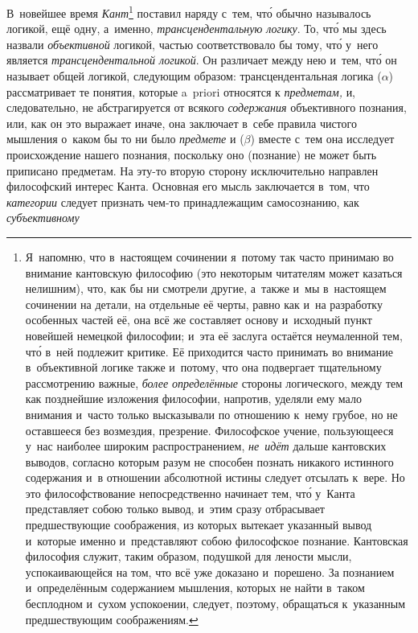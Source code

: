 В~новейшее время {\em Кант}\footnote{
Я~напомню, что в~настоящем сочинении я~потому так часто принимаю во
внимание кантовскую философию (это некоторым читателям может казаться
нелишним), что, как бы ни смотрели другие, а~также и~мы в~настоящем
сочинении на детали, на отдельные её черты, равно как и~на разработку
особенных частей её, она всё же составляет основу и~исходный пункт новейшей
немецкой философии; и~эта её заслуга остаётся неумаленной тем, чт\'{о} в~ней
подлежит критике. Её приходится часто принимать во внимание в~объективной
логике также и~потому, что она подвергает тщательному рассмотрению важные,
{\em более определённые} стороны логического, между тем как
позднейшие изложения философии, напротив, уделяли ему мало внимания и~часто
только высказывали по отношению к~нему грубое, но не оставшееся без
возмездия, презрение. Философское учение, пользующееся у~нас наиболее
широким распространением, {\em не~идёт} дальше кантовских
выводов, согласно которым разум не способен познать никакого истинного
содержания и~в отношении абсолютной истины следует отсылать к~вере. Но это
философствование непосредственно начинает тем, чт\'{о} у~Канта представляет
собою только вывод, и~этим сразу отбрасывает предшествующие соображения,
из которых вытекает указанный вывод и~которые именно и~представляют собою
философское познание. Кантовская философия служит, таким образом, подушкой
для лености мысли, успокаивающейся на том, что всё уже доказано и~порешено.
За познанием и~определённым содержанием мышления, которых не найти в~таком
бесплодном и~сухом успокоении, следует, поэтому, обращаться к~указанным
предшествующим соображениям.} поставил наряду с~тем,
чт\'{о} обычно называлось логикой, ещё одну, а~именно,
{\em трансцендентальную логику}. То, чт\'{о} мы здесь
назвали {\em объективной} логикой, частью
соответствовало бы тому, чт\'{о} у~него является
{\em трансцендентальной логикой}. Он различает между
нею и~тем, чт\'{о} он называет общей логикой, следующим образом:
трансцендентальная логика ($\alpha$) рассматривает те понятия, которые
a~priori относятся к {\em предметам,} и, следовательно,
не абстрагируется от всякого {\em содержания}
объективного познания, или, как он это выражает иначе, она заключает в~себе
правила чистого мышления о~каком бы то ни было
{\em предмете} и ($\beta$) вместе с~тем она исследует
происхождение нашего познания, поскольку оно (познание) не может быть
приписано предметам. На эту-то вторую сторону исключительно направлен
философский интерес Канта. Основная его мысль заключается в~том, что
{\em категории} следует признать чем-то принадлежащим
самосознанию, как {\em субъективному}
